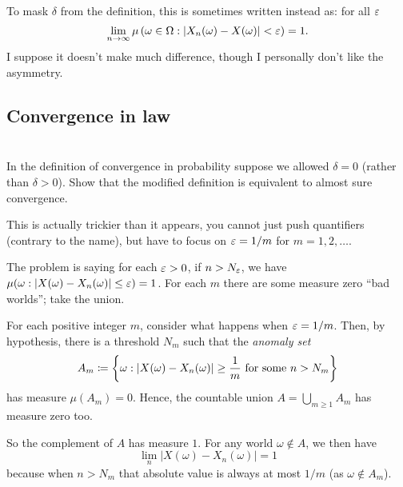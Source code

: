 \begin{remark}
	To mask $\delta$ from the definition,
	this is sometimes written instead as:
	for all $\varepsilon$
	\[ \lim_{n \to \infty} \mu \left( \omega \in \Omega :
		\left\lvert X_n(\omega) - X(\omega) \right\rvert < \varepsilon
		\right) = 1. \]
	I suppose it doesn't make much difference,
	though I personally don't like the asymmetry.
\end{remark}

\subsection{Convergence in law}

\section{\problemhead}
\begin{problem}
	\gim
	In the definition of convergence in probability
	suppose we allowed $\delta = 0$
	(rather than $\delta > 0$).
	Show that the modified definition is
	equivalent to almost sure convergence.
	\begin{hint}
		This is actually trickier than it appears,
		you cannot just push quantifiers (contrary to the name),
		but have to focus on $\varepsilon = 1/m$ for $m = 1, 2, \dots$.

		The problem is saying for each $\varepsilon > 0$,
		if $n > N_\varepsilon$, we have
		$\mu(\omega : |X(\omega)-X_n(\omega)| \le \varepsilon) = 1$.
		For each $m$ there are some measure zero ``bad worlds'';
		take the union.
	\end{hint}
	\begin{sol}
		For each positive integer $m$,
		consider what happens when $\varepsilon = 1/m$.
		Then, by hypothesis, there is a threshold $N_m$
		such that the \emph{anomaly set}
		\[ A_m \coloneqq \left\{ \omega :
			|X(\omega)-X_n(\omega)| \ge \frac 1m
			\text{ for some } n > N_m \right\} \]
		has measure $\mu(A_m) = 0$.
		Hence, the countable union $A = \bigcup_{m \ge 1} A_m$ has measure zero too.

		So the complement of $A$ has measure $1$.
		For any world $\omega \notin A$,
		we then have 
		\[ \lim_n \left\lvert X(\omega) - X_n(\omega) \right\rvert = 1 \]
		because when $n > N_m$ that absolute value
		is always at most $1/m$ (as $\omega \notin A_m$).
	\end{sol}
\end{problem}

